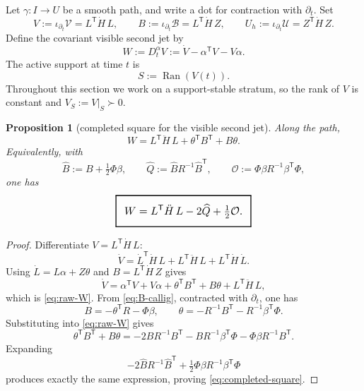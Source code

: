 \documentclass[11pt,a4paper]{article}
\numberwithin{equation}{section}
\DeclareMathOperator{\Ran}{Ran}
\newcommand{\geomboxed}[1]{%
  \setlength{\fboxsep}{8pt}%
  \setlength{\fboxrule}{0.9pt}%
  \fbox{\scalebox{1.10}{$\displaystyle #1$}}%
}
\theoremstyle{thmcompact}
\newtheorem{proposition}[theorem]{Proposition}
\theoremstyle{remark}
\begin{document}
Let $\gamma:I\to U$ be a smooth path, and write a dot for contraction with $\partial_t$. Set
\begin{equation}
V:=\iota_{\partial_t}\mathcal V=L^{\mathsf T}\dot H\,L,
\qquad
B:=\iota_{\partial_t}\mathcal B=L^{\mathsf T}\dot H\,Z,
\qquad
U_h:=\iota_{\partial_t}\mathcal U=Z^{\mathsf T}\dot H\,Z.
\label{eq:pathwise-VBU}
\end{equation}
Define the covariant visible second jet by
\begin{equation}
W:=D_t^{\alpha}V:=\dot V-\alpha^{\mathsf T}V-V\alpha.
\label{eq:W-def}
\end{equation}
The active support at time $t$ is
\[
S:=\Ran(V(t)).
\]
Throughout this section we work on a support-stable stratum, so the rank of $V$ is constant and $V_S:=V|_S\succ0$.

\begin{proposition}[completed square for the visible second jet]\label{prop:completed-square}
Along the path,
\begin{equation}
W=L^{\mathsf T}\ddot H\,L+\theta^{\mathsf T}B^{\mathsf T}+B\theta.
\label{eq:raw-W}
\end{equation}
Equivalently, with
\begin{equation}
\widehat B:=B+\tfrac12\Phi\beta,
\qquad
\widehat Q:=\widehat B R^{-1}\widehat B^{\mathsf T},
\qquad
\mathcal O:=\Phi\beta R^{-1}\beta^{\mathsf T}\Phi,
\label{eq:widehat-defs}
\end{equation}
one has
\begin{equation}
\geomboxed{W=L^{\mathsf T}\ddot H\,L-2\widehat Q+\tfrac12\mathcal O.}
\label{eq:completed-square}
\end{equation}
\end{proposition}

\begin{proof}
Differentiate $V=L^{\mathsf T}\dot H\,L$:
\[
\dot V=\dot L^{\mathsf T}\dot H\,L+L^{\mathsf T}\ddot H\,L+L^{\mathsf T}\dot H\,\dot L.
\]
Using $\dot L=L\alpha+Z\theta$ and $B=L^{\mathsf T}\dot H\,Z$ gives
\[
\dot V=\alpha^{\mathsf T}V+V\alpha+\theta^{\mathsf T}B^{\mathsf T}+B\theta+L^{\mathsf T}\ddot H\,L,
\]
which is \eqref{eq:raw-W}. From \eqref{eq:B-callig}, contracted with $\partial_t$, one has
\[
B=-\theta^{\mathsf T}R-\Phi\beta,
\qquad
\theta=-R^{-1}B^{\mathsf T}-R^{-1}\beta^{\mathsf T}\Phi.
\]
Substituting into \eqref{eq:raw-W} gives
\[
\theta^{\mathsf T}B^{\mathsf T}+B\theta
=-2BR^{-1}B^{\mathsf T}-BR^{-1}\beta^{\mathsf T}\Phi-\Phi\beta R^{-1}B^{\mathsf T}.
\]
Expanding
\[
-2\widehat B R^{-1}\widehat B^{\mathsf T}+\tfrac12\Phi\beta R^{-1}\beta^{\mathsf T}\Phi
\]
produces exactly the same expression, proving \eqref{eq:completed-square}.
\end{proof}
\end{document}

